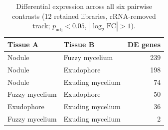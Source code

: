 \begin{table}[htbp]
\caption{Differential expression across all six pairwise contrasts (12 retained libraries, rRNA-removed track; $p_{\mathrm{adj}}<0.05$, $|\log_2\mathrm{FC}|>1$).}\label{tab:s2}
\footnotesize
\begin{tabular}{@{}llr@{}}
\toprule
Tissue A & Tissue B & DE genes \\
\midrule
Nodule & Fuzzy mycelium & 239 \\
Nodule & Exudophore & 198 \\
Nodule & Exuding mycelium & 74 \\
Fuzzy mycelium & Exudophore & 50 \\
Exudophore & Exuding mycelium & 36 \\
Fuzzy mycelium & Exuding mycelium & 2 \\
\bottomrule
\end{tabular}
\end{table}
